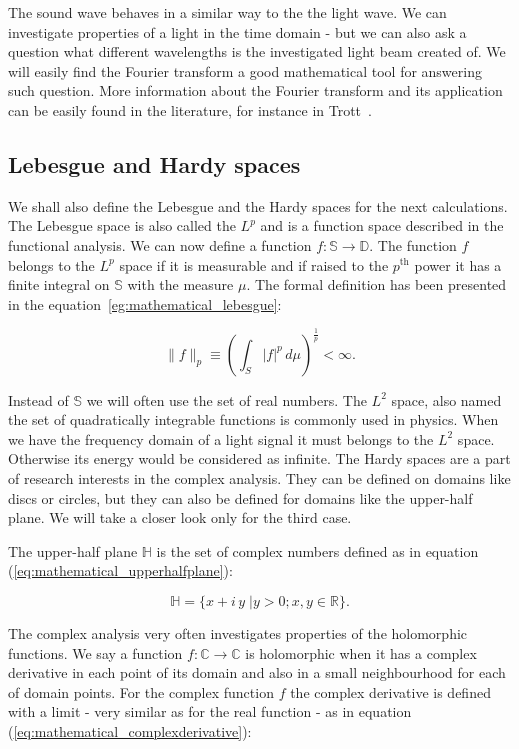 \documentclass[12pt,twoside,a4paper]{article}
\numberwithin{equation}{subsection}
\numberwithin{figure}{subsection}
\begin{document}
The sound wave behaves in a similar way to the the light wave. We can investigate properties of a light in the time domain - but we can also
ask a question what different wavelengths is the investigated light beam created of. We will easily find the Fourier transform a good
mathematical tool for answering such question. More information about the Fourier transform and its application can be easily found in the
literature, for instance in Trott~\cite{trott_mathematica}.

\subsection{Lebesgue and Hardy spaces}

We shall also define the Lebesgue and the Hardy spaces for the next calculations. The Lebesgue space is also called the $L^p$ and is a
function space described in the functional analysis. We can now define a function $f : \mathbb{S} \to \mathbb{D}$. The function $f$ belongs
to the $L^p$ space if it is measurable and if raised to the $p^{\text{th}}$ power it has a finite integral on $\mathbb{S}$ with the measure
$ \mu $. The formal definition has been presented in the equation~\ref{eg:mathematical_lebesgue}:

\begin{equation} \label{eg:mathematical_lebesgue}
  \|f\|_p \equiv ( \int_{S} |f|^p \, d\mu) ^ {\frac{1}{p}} < \infty .
\end{equation}

Instead of $\mathbb{S}$ we will often use the set of real numbers. The $L^2$ space, also named the set of quadratically integrable functions
is commonly used in physics. When we have the frequency domain of a light signal it must belongs to the $L^2$ space. Otherwise its energy would
be considered as infinite. The Hardy spaces are a part of research interests in the complex analysis. They can be defined on domains like
discs or circles, but they can also be defined for domains like the upper-half plane. We will take a closer look only for the third case.

The upper-half plane $ \mathbb{H} $ is the set of complex numbers defined as in equation (\ref{eq:mathematical_upperhalfplane}):

\begin{equation} \label{eq:mathematical_upperhalfplane}
  \mathbb{H} = \{ x + i \, y \;| y > 0; x, y \in \mathbb{R} \} .
\end{equation}

The complex analysis very often investigates properties of the holomorphic functions. We say a function $f : \mathbb{C} \to \mathbb{C}$ is
holomorphic when it has a complex derivative in each point of its domain and also in a small neighbourhood for each of domain points. For
the complex function $f$ the complex derivative is defined with a limit - very similar as for the real function - as in equation
(\ref{eq:mathematical_complexderivative}):
\end{document}
